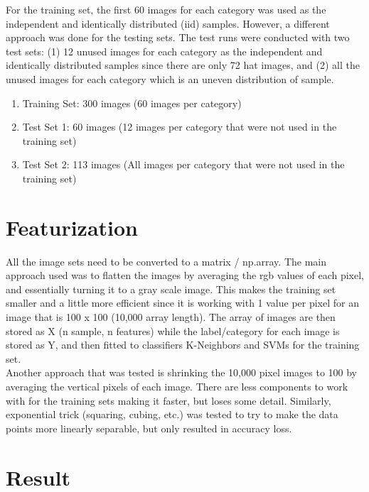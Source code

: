 \documentclass{article}
\begin{document}
  For the training set, the first 60 images for each category was used as the independent and identically distributed (iid) samples. However, a different approach was done for the testing sets. The test runs were conducted with two test sets: (1) 12 unused images for each category as the independent and identically distributed samples since there are only 72 hat images, and (2) all the unused images for each category which is an uneven distribution of sample.
  
  \begin{enumerate}
  	\item Training Set: 300 images (60 images per category)
  	\item Test Set 1: 60 images (12 images per category that were not used in the training set)
  	\item Test Set 2: 113 images (All images per category that were not used in the training set)
  \end{enumerate}
  
  \section{Featurization}
  
  All the image sets need to be converted to a matrix / np.array. The main approach used was to flatten the images by averaging the rgb values of each pixel, and essentially turning it to a  gray scale image. This makes the training set smaller and a little more efficient since it is working with 1 value per pixel for an image that is 100 x 100 (10,000 array length). The array of images are then stored as X (n sample, n features) while the label/category for each image is stored as Y, and then fitted to classifiers K-Neighbors and SVMs for the training set.\\
  
  Another approach that was tested is shrinking the 10,000 pixel images to 100 by averaging the vertical pixels of each image. There are less components to work with for the training sets making it faster, but loses some detail. Similarly, exponential trick (squaring, cubing, etc.) was tested to try to make the data points more linearly separable, but only resulted in accuracy loss.
  
  
  \section{Result}
   
\end{document}

